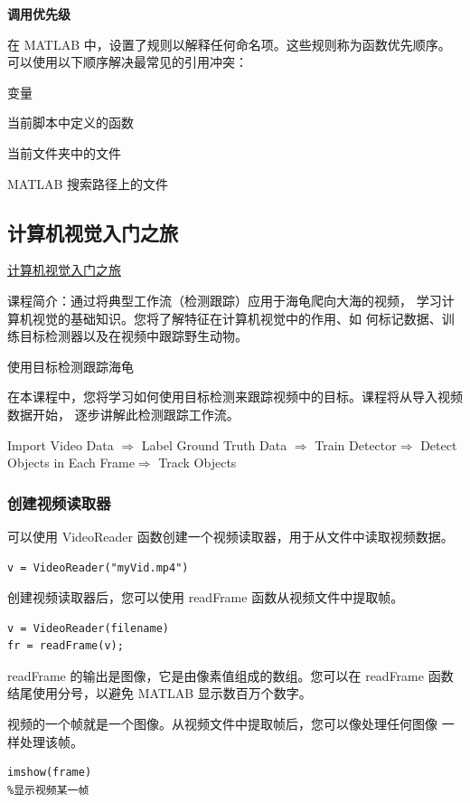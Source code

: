 \documentclass[12pt,a4paper]{article}
\begin{document}
\textbf{调用优先级}

在 MATLAB 中，设置了规则以解释任何命名项。这些规则称为函数优先顺序。
可以使用以下顺序解决最常见的引用冲突：

变量

当前脚本中定义的函数

当前文件夹中的文件

MATLAB 搜索路径上的文件


\subsection{计算机视觉入门之旅}

\href{https://matlabacademy.mathworks.com/cn/details/computer-vision-onramp/orcv}{计算机视觉入门之旅}

课程简介：通过将典型工作流（检测跟踪）应用于海龟爬向大海的视频，
学习计算机视觉的基础知识。您将了解特征在计算机视觉中的作用、如
何标记数据、训练目标检测器以及在视频中跟踪野生动物。

{\large 使用目标检测跟踪海龟}

在本课程中，您将学习如何使用目标检测来跟踪视频中的目标。课程将从导入视频数据开始，
逐步讲解此检测跟踪工作流。

Import Video Data $\Rightarrow $ 
Label Ground Truth Data $\Rightarrow $ 
Train Detector$\Rightarrow $ 
Detect Objects in Each Frame$\Rightarrow $ 
Track Objects

\subsubsection{创建视频读取器}

可以使用 VideoReader 函数创建一个视频读取器，用于从文件中读取视频数据。

\begin{lstlisting}
v = VideoReader("myVid.mp4")
\end{lstlisting}

创建视频读取器后，您可以使用 readFrame 函数从视频文件中提取帧。

\begin{lstlisting}
v = VideoReader(filename)
fr = readFrame(v);
\end{lstlisting}

readFrame 的输出是图像，它是由像素值组成的数组。您可以在 readFrame 
函数结尾使用分号，以避免 MATLAB 显示数百万个数字。

视频的一个帧就是一个图像。从视频文件中提取帧后，您可以像处理任何图像
一样处理该帧。

\begin{lstlisting}
imshow(frame)
%显示视频某一帧
\end{lstlisting}
\end{document}
